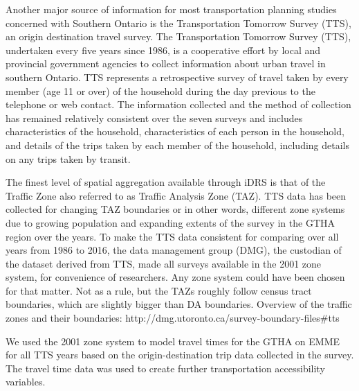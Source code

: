 Another major source of information for most transportation planning studies concerned with Southern Ontario is the Transportation Tomorrow Survey (TTS)\cite{DataManagementGroup2014}, an origin destination travel survey.
The Transportation Tomorrow Survey (TTS), undertaken every five years since 1986, is a cooperative effort by local and provincial government agencies to collect information about urban travel in southern Ontario.
TTS represents a retrospective survey of travel taken by every member (age 11 or over) of the household during the day previous to the telephone or web contact.
The information collected and the method of collection has remained relatively consistent over the seven surveys and includes characteristics of the household, characteristics of each person in the household, and details of the trips taken by each member of the household, including details on any trips taken by transit\cite{Ashby2018}.

The finest level of spatial aggregation available through iDRS is that of the Traffic Zone also referred to as Traffic Analysis Zone (TAZ).
TTS data has been collected for changing TAZ boundaries or in other words, different zone systems due to growing population and expanding extents of the survey in the GTHA region over the years.
To make the TTS data consistent for comparing over all years from 1986 to 2016, the data management group (DMG), the custodian of the dataset derived from TTS, made all surveys available in the 2001 zone system, for convenience of researchers.
Any zone system could have been chosen for that matter.
Not as a rule, but the TAZs roughly follow census tract boundaries, which are slightly bigger than DA boundaries.
Overview of the traffic zones and their boundaries: http://dmg.utoronto.ca/survey-boundary-files#tts

We used the 2001 zone system to model travel times for the GTHA on EMME for all TTS years based on the origin-destination trip data collected in the survey.
The travel time data was used to create further transportation accessibility variables.
